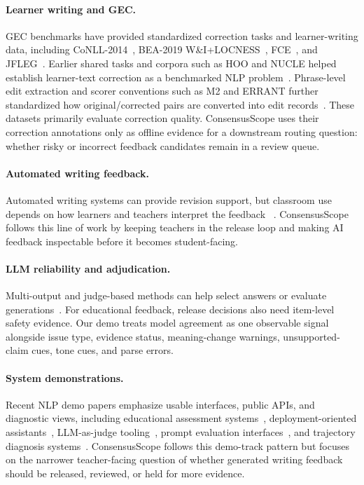 \documentclass[11pt]{article}
\begin{document}
\paragraph{Learner writing and GEC.}
GEC benchmarks have provided standardized correction tasks and learner-writing
data, including CoNLL-2014~\cite{ng-etal-2014-conll}, BEA-2019
W\&I+LOCNESS~\cite{bryant-etal-2019-bea}, FCE~\cite{yannakoudakis2011fce}, and
JFLEG~\cite{napoles-etal-2017-jfleg}. Earlier shared tasks and corpora such as
HOO and NUCLE helped establish learner-text correction as a benchmarked NLP
problem~\cite{dale-kilgarriff-2011-helping,dahlmeier-etal-2013-building}.
Phrase-level edit extraction and scorer conventions such as M2 and ERRANT
further standardized how original/corrected pairs are converted into edit
records~\cite{dahlmeier-ng-2012-better,bryant-etal-2017-automatic}. These
datasets primarily evaluate correction quality. ConsensusScope uses their
correction annotations only as offline evidence for a downstream routing
question: whether risky or incorrect feedback candidates remain in a review
queue.

\paragraph{Automated writing feedback.}
Automated writing systems can provide revision support, but classroom use
depends on how learners and teachers interpret the feedback
~\cite{madnani-etal-2018-writing,ranalli2018automated}. ConsensusScope follows
this line of work by keeping teachers in the release loop and making AI feedback
inspectable before it becomes student-facing.

\paragraph{LLM reliability and adjudication.}
Multi-output and judge-based methods can help select answers or evaluate
generations~\cite{wang2023selfconsistency,zheng2023judging,liu2023geval}.
For educational feedback, release decisions also need item-level safety
evidence. Our demo treats model agreement as one observable signal alongside
issue type, evidence status, meaning-change warnings, unsupported-claim cues,
tone cues, and parse errors.

\paragraph{System demonstrations.}
Recent NLP demo papers emphasize usable interfaces, public APIs, and diagnostic
views, including educational assessment systems~\cite{li-etal-2025-aera},
deployment-oriented assistants~\cite{trienes-etal-2025-marcel,jang-etal-2025-medtutor},
LLM-as-judge tooling~\cite{santillan-cooper-etal-2025-synthetic}, prompt
evaluation interfaces~\cite{habba-etal-2025-promptsuite}, and trajectory
diagnosis systems~\cite{ou-etal-2025-agentdiagnose}. ConsensusScope follows
this demo-track pattern but focuses on the narrower teacher-facing question of
whether generated writing feedback should be released, reviewed, or held for
more evidence.
\end{document}
